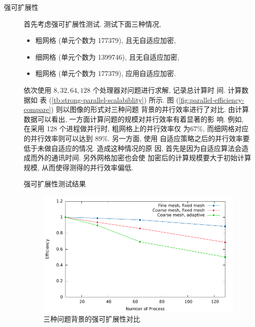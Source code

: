 \begin{description}

\item[强可扩展性] 首先考虑强可扩展性测试. 测试下面三种情况,
  \begin{itemize}
  \item 粗网格 (单元个数为 177379), 且无自适应加密,
  \item 细网格 (单元个数为 1399746), 且无自适应加密,
  \item 粗网格 (单元个数为 177379), 应用自适应加密.
  \end{itemize}
  依次使用 $8, 32, 64, 128$ 个处理器对问题进行求解, 记录总计算时
  间. 计算数据如
  表 (\ref{tb:strong-parallel-scalabiblity}) 所示. 图
  (\ref{fig:parallel-efficiency-compare}) 则以图像的形式对三种问题
  背景的并行效率进行了对比.
  由计算数据可以看出, 一方面计算问题的规模对并行效率有着显著的影
  响. 例如, 在采用 128 个进程做并行时, 粗网格上的并行效率仅
  为$67\%$, 而细网格对应的并行效率则可以达到 $89\%$. 另一方面, 使用
  自适应策略之后的并行效率要低于未做自适应的情况. 造成这种情况的原
  因, 首先是因为自适应算法会造成而外的通讯时间. 另外网格加密也会使
  加密后的计算规模要大于初始计算规模, 从而使得测得的并行效率偏低.
  \begin{center}
    \scriptsize
    \begin{table}
      
      \caption{强可扩展性测试结果}
      \label{tb:strong-parallel-scalabiblity}
    \end{table}
  \end{center}
  \begin{figure}
    \centering
    \includegraphics[scale=1.0]{./Pho/Chp4/parallel_efficiency.pdf}
    \caption{三种问题背景的强可扩展性对比}

\end{figure}
\end{description}
